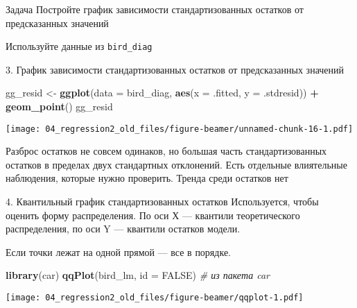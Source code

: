 \documentclass[
  ignorenonframetext,
  t,xcolor=table]{beamer}
\newenvironment{Shaded}{\begin{snugshade}}{\end{snugshade}}
\newcommand{\AttributeTok}[1]{\textcolor[rgb]{0.13,0.29,0.53}{#1}}
\newcommand{\CommentTok}[1]{\textcolor[rgb]{0.56,0.35,0.01}{\textit{#1}}}
\newcommand{\ConstantTok}[1]{\textcolor[rgb]{0.56,0.35,0.01}{#1}}
\newcommand{\FunctionTok}[1]{\textcolor[rgb]{0.13,0.29,0.53}{\textbf{#1}}}
\newcommand{\NormalTok}[1]{#1}
\newcommand{\OtherTok}[1]{\textcolor[rgb]{0.56,0.35,0.01}{#1}}
\newcommand{\SpecialCharTok}[1]{\textcolor[rgb]{0.81,0.36,0.00}{\textbf{#1}}}
\begin{document}
\begin{frame}[fragile]{Задача}
\protect\hypertarget{ux437ux430ux434ux430ux447ux430-3}{}
Постройте график зависимости стандартизованных остатков от предсказанных
значений

Используйте данные из \texttt{bird\_diag}
\end{frame}

\begin{frame}[fragile]{3. График зависимости стандартизованных остатков
от предсказанных значений}
\protect\hypertarget{ux433ux440ux430ux444ux438ux43a-ux437ux430ux432ux438ux441ux438ux43cux43eux441ux442ux438-ux441ux442ux430ux43dux434ux430ux440ux442ux438ux437ux43eux432ux430ux43dux43dux44bux445-ux43eux441ux442ux430ux442ux43aux43eux432-ux43eux442-ux43fux440ux435ux434ux441ux43aux430ux437ux430ux43dux43dux44bux445-ux437ux43dux430ux447ux435ux43dux438ux439}{}
\begin{Shaded}
\begin{Highlighting}[]
\NormalTok{gg\_resid }\OtherTok{\textless{}{-}} \FunctionTok{ggplot}\NormalTok{(}\AttributeTok{data =}\NormalTok{ bird\_diag, }\FunctionTok{aes}\NormalTok{(}\AttributeTok{x =}\NormalTok{ .fitted, }\AttributeTok{y =}\NormalTok{ .stdresid)) }\SpecialCharTok{+} 
  \FunctionTok{geom\_point}\NormalTok{()}
\NormalTok{gg\_resid}
\end{Highlighting}
\end{Shaded}

\texttt{[image: 04\_regression2\_old\_files/figure-beamer/unnamed-chunk-16-1.pdf]}

\pause

Разброс остатков не совсем одинаков, но большая часть стандартизованных
остатков в пределах двух стандартных отклонений. Есть отдельные
влиятельные наблюдения, которые нужно проверить. Тренда среди остатков
нет
\end{frame}

\begin{frame}[fragile]{4. Квантильный график стандартизованных остатков}
\protect\hypertarget{ux43aux432ux430ux43dux442ux438ux43bux44cux43dux44bux439-ux433ux440ux430ux444ux438ux43a-ux441ux442ux430ux43dux434ux430ux440ux442ux438ux437ux43eux432ux430ux43dux43dux44bux445-ux43eux441ux442ux430ux442ux43aux43eux432}{}
Используется, чтобы оценить форму распределения. По оси Х --- квантили
теоретического распределения, по оси Y --- квантили остатков модели.

Если точки лежат на одной прямой --- все в порядке.

\begin{Shaded}
\begin{Highlighting}[]
\FunctionTok{library}\NormalTok{(car)}
\FunctionTok{qqPlot}\NormalTok{(bird\_lm, }\AttributeTok{id =} \ConstantTok{FALSE}\NormalTok{) }\CommentTok{\# из пакета car}
\end{Highlighting}
\end{Shaded}

\texttt{[image: 04\_regression2\_old\_files/figure-beamer/qqplot-1.pdf]}
\end{frame}
\end{document}
